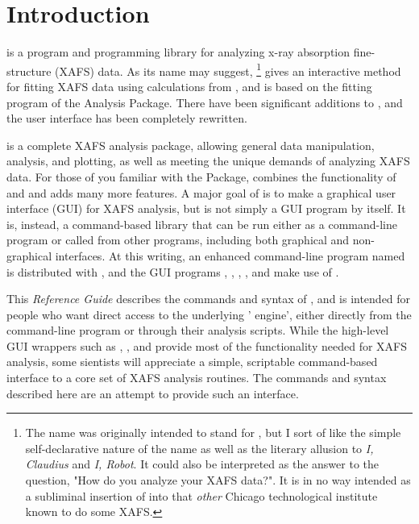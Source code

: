 \section{Introduction} \label{Ch:intro}

{\ifeffit} is a program and programming library for analyzing x-ray
absorption fine-structure (XAFS) data.  As its name may suggest,
{\ifeffit}{\footnote{The name was originally intended to stand for
    {} {\feffit}, but I sort of like the simple
    self-declarative nature of the name as well as the literary allusion to
    {\textsl{I, Claudius}} and {\textsl{I, Robot}}.  It could also be
    interpreted as the answer to the question, "How do you analyze your
    XAFS data?".  It is in no way intended as a subliminal insertion of
    {\feff} into that {\emph{other}} Chicago technological institute known
    to do some XAFS.}}  
gives an interactive method for fitting XAFS data using calculations from
{\feff}, and is based on the fitting program {\feffit} of the {\uwxafs}
Analysis Package.  There have been significant additions to {\feffit}, and
the user interface has been completely rewritten.

{\ifeffit} is a complete XAFS analysis package, allowing general data
manipulation, analysis, and plotting, as well as meeting the unique demands
of analyzing XAFS data.  For those of you familiar with the {\uwxafs}
Package, {\ifeffit} combines the functionality of {\autobk} and {\feffit}
and adds many more features.  A major goal of {\ifeffit} is to make a
graphical user interface (GUI) for XAFS analysis, but {\ifeffit} is not
simply a GUI program by itself.  It is, instead, a command-based library
that can be run either as a command-line program or called from other
programs, including both graphical and non-graphical interfaces.  At this
writing, an enhanced command-line program named {\gifeffit} is distributed
with {\ifeffit}, and the GUI programs {},
{}, {}, {}, and
{} make use of {\ifeffit}.

This {\textsl{Reference Guide}} describes the commands and syntax of
{\ifeffit}, and is intended for people who want direct access to the
underlying '{\ifeffit} engine', either directly from the command-line
program or through their analysis scripts.  While the high-level GUI
wrappers such as {}, {}, and
{} provide most of the functionality needed for XAFS
analysis, some sientists will appreciate a simple, scriptable command-based
interface to a core set of XAFS analysis routines.  The commands and syntax
described here are an attempt to provide such an interface.

